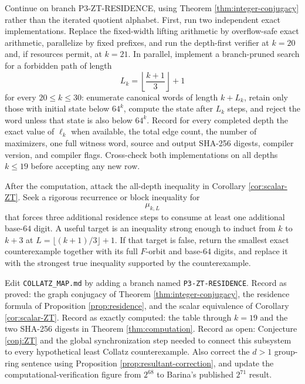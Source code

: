 \documentclass[11pt]{article}
\theoremstyle{definition}
\theoremstyle{remark}
\begin{document}
Continue on branch P3-ZT-RESIDENCE, using Theorem \ref{thm:integer-conjugacy} rather than the iterated quotient alphabet. First, run two independent exact implementations. Replace the fixed-width lifting arithmetic by overflow-safe exact arithmetic, parallelize by fixed prefixes, and run the depth-first verifier at $k=20$ and, if resources permit, at $k=21$. In parallel, implement a branch-pruned search for a forbidden path of length
\[
L_k=\left\lfloor\frac{k+1}{3}\right\rfloor+1
\]
for every $20\le k\le30$: enumerate canonical words of length $k+L_k$, retain only those with initial state below $64^k$, compute the state after $L_k$ steps, and reject the word unless that state is also below $64^k$. Record for every completed depth the exact value of $\ell_k$ when available, the total edge count, the number of maximizers, one full witness word, source and output SHA-256 digests, compiler version, and compiler flags. Cross-check both implementations on all depths $k\le19$ before accepting any new row.

After the computation, attack the all-depth inequality in Corollary \ref{cor:scalar-ZT}. Seek a rigorous recurrence or block inequality for
\[
\mu_{k,L}
\]
that forces three additional residence steps to consume at least one additional base-$64$ digit. A useful target is an inequality strong enough to induct from $k$ to $k+3$ at $L=\lfloor(k+1)/3\rfloor+1$. If that target is false, return the smallest exact counterexample together with its full $F$-orbit and base-$64$ digits, and replace it with the strongest true inequality supported by the counterexample.

Edit \texttt{COLLATZ\_MAP.md} by adding a branch named \texttt{P3-ZT-RESIDENCE}. Record as proved: the graph conjugacy of Theorem \ref{thm:integer-conjugacy}, the residence formula of Proposition \ref{prop:residence}, and the scalar equivalence of Corollary \ref{cor:scalar-ZT}. Record as exactly computed: the table through $k=19$ and the two SHA-256 digests in Theorem \ref{thm:computation}. Record as open: Conjecture \ref{conj:ZT} and the global synchronization step needed to connect this subsystem to every hypothetical least Collatz counterexample. Also correct the $d>1$ group-ring sentence using Proposition \ref{prop:resultant-correction}, and update the computational-verification figure from $2^{68}$ to Barina's published $2^{71}$ result.
\end{document}
